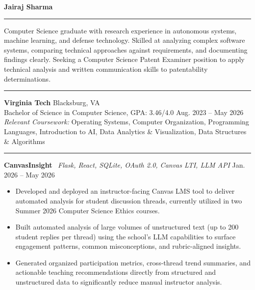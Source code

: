 \documentclass[letterpaper,10pt]{article}
\newcommand{\resumesection}[1]{%
    \vspace{6pt}
    \noindent{\large\bfseries #1}\par
    \vspace{2pt}
    \hrule
    \vspace{4pt}
}
\begin{document}
\begin{center}
    {\LARGE \textbf{Jairaj Sharma}}\\[2.5pt]
\end{center}

\resumesection{Summary}
Computer Science graduate with research experience in autonomous systems, machine learning, and defense technology. Skilled at analyzing complex software systems, comparing technical approaches against requirements, and documenting findings clearly. Seeking a Computer Science Patent Examiner position to apply technical analysis and written communication skills to patentability determinations.

\resumesection{Education}
\textbf{Virginia Tech} \hfill Blacksburg, VA\\
Bachelor of Science in Computer Science, GPA: 3.46/4.0 \hfill Aug. 2023 -- May 2026\\
\textit{Relevant Coursework:} Operating Systems, Computer Organization, Programming Languages, Introduction to AI, Data Analytics \& Visualization, Data Structures \& Algorithms

\resumesection{Projects}

\textbf{CanvasInsight} \textbar\ \textit{Flask, React, SQLite, OAuth 2.0, Canvas LTI, LLM API} \hfill Jan. 2026 -- May 2026
\begin{itemize}
    \item Developed and deployed an instructor-facing Canvas LMS tool to deliver automated analysis for student discussion threads, currently utilized in two Summer 2026 Computer Science Ethics courses.
    \item Built automated analysis of large volumes of unstructured text (up to 200 student replies per thread) using the school's LLM capabilities to surface engagement patterns, common misconceptions, and rubric-aligned insights.
    \item Generated organized participation metrics, cross-thread trend summaries, and actionable teaching recommendations directly from structured and unstructured data to significantly reduce manual instructor analysis.
\end{itemize}
\end{document}
